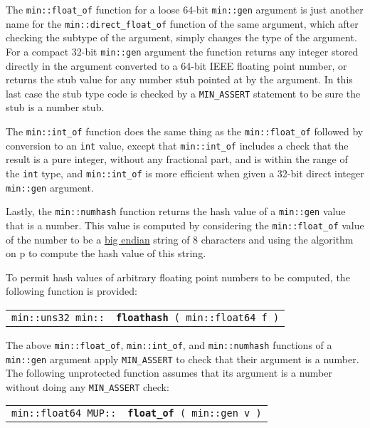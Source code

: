 \documentclass[12pt]{article}
\makeatletter
\newcommand{\ttindex}[1]{\index{#1@{\tt #1}}}
\newcommand{\minindex}[1]{\ttindex{min::#1}\ttindex{#1}}
\newcommand{\MUPindex}[1]{\ttindex{MUP::#1}\ttindex{#1}}
\newcommand{\pagref}[1]{p\pageref{#1}}
\newenvironment{indpar}[1][0.3in]%
	{\begin{list}{}%
		     {\setlength{\itemsep}{0in}%
		      \setlength{\topsep}{0in}%
		      \setlength{\parsep}{1ex}%
		      \setlength{\labelwidth}{#1}%
		      \setlength{\leftmargin}{#1}%
		      \addtolength{\leftmargin}{\labelsep}}%
	 \item}%
	{\end{list}}
\newcommand{\LABEL}[1]{\label{#1}}
\newcommand{\MINKEY}[1]{{\tt \bf #1}\minindex{#1}}
\newcommand{\MUPKEY}[1]{{\tt \bf #1}\MUPindex{#1}}
\makeatother
\begin{document}
The \verb|min::float_of| function for a loose 64-bit \verb|min::gen|
argument is just another name for the \verb|min::direct_float_of| function
of the same argument, which after checking the subtype of the argument,
simply changes the type of the argument.
For a compact 32-bit \verb|min::gen| argument the
function returns any integer stored directly
in the argument converted to a 64-bit IEEE floating point number, or
returns the stub value for any number stub pointed at by the argument.
In this last case the stub type code is checked by a \verb|MIN_ASSERT|
statement to be sure the stub is a number stub.

The \verb|min::int_of| function does the same thing as the
\verb|min::float_of| followed by conversion to an \verb|int| value,
except that \verb|min::int_of| includes a check that the result
is a pure integer, without any fractional part, and is within the
range of the \verb|int| type, and
\verb|min::int_of| is more efficient when given a 32-bit direct integer
\verb|min::gen| argument.

Lastly, the \verb|min::numhash| function
returns the hash value of a \verb|min::gen|
value that is a number.  This value is computed by considering
the \verb|min::float_of| value of the number
to be a \underline{big endian} string of 8 characters and using the algorithm
on \pagref{HASH-ALGORITHM} to compute the hash value of this string.%
\label{NUMBER-HASH-ALGORITHM}

To permit hash values of arbitrary floating point numbers to be computed,
the following function is provided:

\begin{indpar}\begin{tabular}{r@{}l}
\verb|min::uns32 min::| & \MINKEY{floathash}\verb| ( min::float64 f )|
\LABEL{MIN::FLOATHASH} \\
\end{tabular}\end{indpar}

The above \verb|min::float_of|, \verb|min::int_of|, and \verb|min::numhash|
functions of a \verb|min::gen| argument apply \verb|MIN_ASSERT| to check
that their argument is a number.  The following unprotected function assumes
that its argument is a number without doing any \verb|MIN_ASSERT| check:

\begin{indpar}\begin{tabular}{r@{}l}
\verb|min::float64 MUP::| & \MUPKEY{float\_of}\verb| ( min::gen v )|
\LABEL{MUP::FLOAT_OF_GEN}
\end{tabular}\end{indpar}
\end{document}
